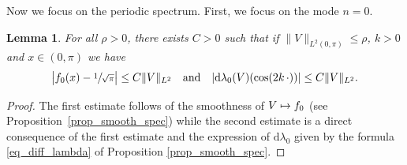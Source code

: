 \documentclass[JEP,XML,SOM,Unicode,NoEqCountersInSection,published]{cedram}
\newcommand\mto{\mathchoice{\longmapsto}{\mapsto}{\mapsto}{\mapsto}}
\newtheorem{lemma}[theorem]{Lemma}
\theoremstyle{definition}
\begin{document}
Now we focus on the periodic spectrum. First, we focus on the mode $n=0$.
\begin{lemma}
\label{lem_mode0}
For all $\rho>0$, there exists $C>0$ such that if $\|V\|_{L^2(0,\pi)}\leq \rho$, $k>0$ and $x\in (0,\pi)$ we have
\[
\big|f_0(x) - \sfrac1{\sqrt\pi}\big|\leq C \| V\|_{L^2} \quad \text{and} \quad |\mathrm{d}\lambda_0(V)(\cos(2k \, \cdot ))| \leq C \| V\|_{L^2}.
\]
\end{lemma}
\begin{proof} The first estimate follows of the smoothness of $V \mto f_0$ (see Proposition~\ref{prop_smooth_spec}) while the second estimate is a direct consequence of the first estimate and the expression of $\mathrm{d}\lambda_0$ given by the formula \eqref{eq_diff_lambda} of Proposition \ref{prop_smooth_spec}.
\end{proof}
\end{document}

